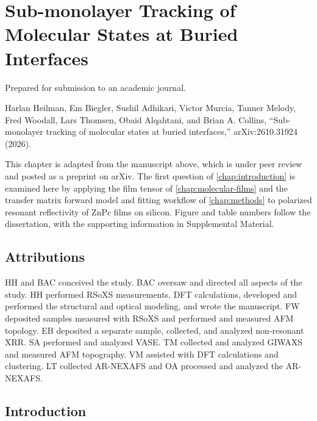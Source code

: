 \chapter{Sub-monolayer Tracking of Molecular States at Buried Interfaces}\label{chap:znpc}

Prepared for submission to an academic journal.

Harlan Heilman, Em Biegler, Sushil Adhikari, Victor Murcia, Tanner Melody, Fred Woodall, Lars Thomsen, Obaid Alqahtani, and Brian A. Collins, ``Sub-monolayer tracking of molecular states at buried interfaces,'' arXiv:2610.31924 (2026).\autocite{zotero-item-2198}

This chapter is adapted from the manuscript above, which is under peer review and posted as a preprint on arXiv. The first question of \cref{chap:introduction} is examined here by applying the film tensor of \cref{chap:molecular-films} and the transfer matrix forward model and fitting workflow of \cref{chap:methods} to polarized resonant reflectivity of ZnPc films on silicon. Figure and table numbers follow the dissertation, with the supporting information in Supplemental Material.

\section{Attributions}\label{sec:attributions}

HH and BAC conceived the study. BAC oversaw and directed all aspects of the study. HH performed RSoXS measurements, DFT calculations, developed and performed the structural and optical modeling, and wrote the manuscript. FW deposited samples measured with RSoXS and performed and measured AFM topology. EB deposited a separate sample, collected, and analyzed non-resonant XRR. SA performed and analyzed VASE. TM collected and analyzed GIWAXS and measured AFM topography. VM assisted with DFT calculations and clustering. LT collected AR-NEXAFS and OA processed and analyzed the AR-NEXAFS.

\section{Introduction}\label{sec:introduction}

